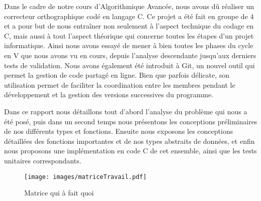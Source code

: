 Dans le cadre de notre cours d'Algorithmique Avancée, nous avons dû réaliser un correcteur orthographique codé en langage C. Ce projet a été fait en groupe de 4 et a pour but de nous entraîner non seulement à l'aspect technique du codage en C, mais aussi à tout l'aspect théorique qui concerne toutes les étapes d'un projet informatique. Ainsi nous avons essayé de mener à bien toutes les phases du cycle en V que nous avons vu en cours, depuis l'analyse descendante jusqu'aux derniers tests de validation. Nous avons également été introduit à Git, un nouvel outil qui permet la gestion de code partagé en ligne. Bien que parfois délicate, son utilisation permet de faciliter la coordination entre les membres pendant le développement et la gestion des versions successives du programme.

\bigskip

Dans ce rapport nous détaillons tout d'abord l'analyse du problème qui nous a été posé, puis dans un second temps nous présentons les conceptions préliminaires de nos différents types et fonctions. Ensuite nous exposons les conceptions détaillées des fonctions importantes et de nos types abstraits de données, et enfin nous proposons une implémentation en code C de cet ensemble, ainsi que les tests unitaires correspondants.

\bigskip

\begin{figure}[H]
	\centering 
	\texttt{[image: images/matriceTravail.pdf]}
	\caption{Matrice qui à fait quoi}
\end{figure}